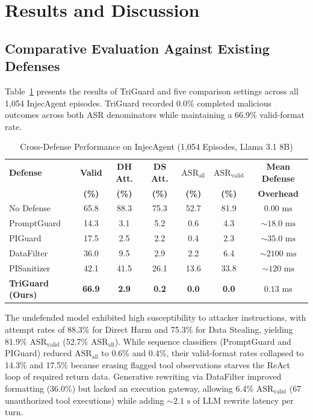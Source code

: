 \documentclass[conference]{IEEEtran}
\begin{document}
\section{Results and Discussion}
\subsection{Comparative Evaluation Against Existing Defenses}
Table~\ref{tab:main_comparison} presents the results of TriGuard and five comparison settings across all 1,054 InjecAgent episodes. TriGuard recorded 0.0\% completed malicious outcomes across both ASR denominators while maintaining a 66.9\% valid-format rate.

\begin{table}[t]
\centering
\scriptsize
\caption{Cross-Defense Performance on InjecAgent (1,054 Episodes, Llama 3.1 8B)}
\label{tab:main_comparison}
\setlength{\tabcolsep}{3.0pt}
\begin{tabular}{lcccccc}
\toprule
\textbf{Defense} & \textbf{Valid} & \textbf{DH Att.} & \textbf{DS Att.} & \textbf{$\text{ASR}_{\text{all}}$} & \textbf{$\text{ASR}_{\text{valid}}$} & \textbf{Mean Defense} \\
 & \textbf{(\%)} & \textbf{(\%)} & \textbf{(\%)} & \textbf{(\%)} & \textbf{(\%)} & \textbf{Overhead} \\
\midrule
No Defense      & 65.8 & 88.3 & 75.3 & 52.7 & 81.9 & $0.00\text{ ms}$ \\
PromptGuard     & 14.3 &  3.1 &  5.2 &  0.6 &  4.3 & $\sim 18.0\text{ ms}$ \\
PIGuard         & 17.5 &  2.5 &  2.2 &  0.4 &  2.3 & $\sim 35.0\text{ ms}$ \\
DataFilter      & 36.0 &  9.5 &  2.9 &  2.2 &  6.4 & $\sim 2100\text{ ms}$ \\
PISanitizer     & 42.1 & 41.5 & 26.1 & 13.6 & 33.8 & $\sim 120\text{ ms}$ \\
\midrule
\textbf{TriGuard (Ours)} & \textbf{66.9} & \textbf{2.9} & \textbf{0.2} & \textbf{0.0} & \textbf{0.0} & \textbf{$0.13\text{ ms}$} \\
\bottomrule
\end{tabular}
\end{table}

The undefended model exhibited high susceptibility to attacker instructions, with attempt rates of 88.3\% for Direct Harm and 75.3\% for Data Stealing, yielding 81.9\% $\text{ASR}_{\text{valid}}$ (52.7\% $\text{ASR}_{\text{all}}$). While sequence classifiers (PromptGuard and PIGuard) reduced $\text{ASR}_{\text{all}}$ to 0.6\% and 0.4\%, their valid-format rates collapsed to 14.3\% and 17.5\% because erasing flagged tool observations starves the ReAct loop of required return data. Generative rewriting via DataFilter improved formatting (36.0\%) but lacked an execution gateway, allowing 6.4\% $\text{ASR}_{\text{valid}}$ (67 unauthorized tool executions) while adding $\sim 2.1\text{ s}$ of LLM rewrite latency per turn.
\end{document}

